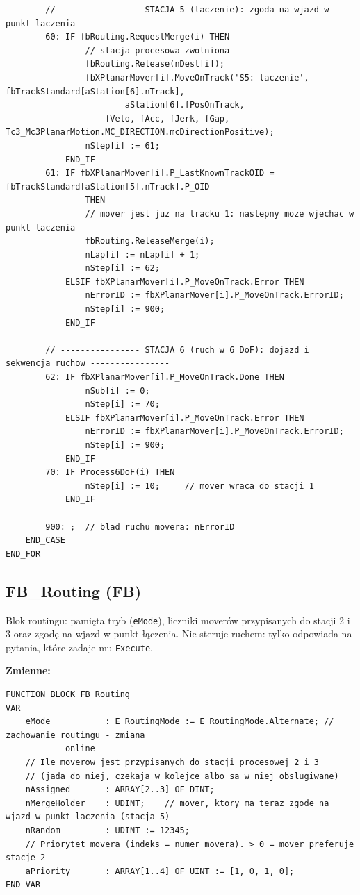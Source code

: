 \documentclass[11pt,a4paper]{report}
\newcommand{\podrozdzial}[1]{\subsection*{#1}\addcontentsline{toc}{subsection}{#1}}
\begin{document}
{\begin{verbatim}
        // ---------------- STACJA 5 (laczenie): zgoda na wjazd w punkt laczenia ----------------
        60: IF fbRouting.RequestMerge(i) THEN
                // stacja procesowa zwolniona
                fbRouting.Release(nDest[i]);
                fbXPlanarMover[i].MoveOnTrack('S5: laczenie', fbTrackStandard[aStation[6].nTrack],
                        aStation[6].fPosOnTrack,
                    fVelo, fAcc, fJerk, fGap, Tc3_Mc3PlanarMotion.MC_DIRECTION.mcDirectionPositive);
                nStep[i] := 61;
            END_IF
        61: IF fbXPlanarMover[i].P_LastKnownTrackOID = fbTrackStandard[aStation[5].nTrack].P_OID
                THEN
                // mover jest juz na tracku 1: nastepny moze wjechac w punkt laczenia
                fbRouting.ReleaseMerge(i);
                nLap[i] := nLap[i] + 1;
                nStep[i] := 62;
            ELSIF fbXPlanarMover[i].P_MoveOnTrack.Error THEN
                nErrorID := fbXPlanarMover[i].P_MoveOnTrack.ErrorID;
                nStep[i] := 900;
            END_IF

        // ---------------- STACJA 6 (ruch w 6 DoF): dojazd i sekwencja ruchow ----------------
        62: IF fbXPlanarMover[i].P_MoveOnTrack.Done THEN
                nSub[i] := 0;
                nStep[i] := 70;
            ELSIF fbXPlanarMover[i].P_MoveOnTrack.Error THEN
                nErrorID := fbXPlanarMover[i].P_MoveOnTrack.ErrorID;
                nStep[i] := 900;
            END_IF
        70: IF Process6DoF(i) THEN
                nStep[i] := 10;     // mover wraca do stacji 1
            END_IF

        900: ;  // blad ruchu movera: nErrorID
    END_CASE
END_FOR
\end{verbatim}}

\podrozdzial{FB\_Routing (FB)}
Blok routingu: pamięta tryb (\texttt{eMode}), liczniki moverów przypisanych do stacji 2 i 3 oraz zgodę na wjazd w punkt łączenia. Nie steruje ruchem: tylko odpowiada na pytania, które zadaje mu \texttt{Execute}.

\textbf{Zmienne:}
{\scriptsize
\begin{verbatim}
FUNCTION_BLOCK FB_Routing
VAR
    eMode           : E_RoutingMode := E_RoutingMode.Alternate; // zachowanie routingu - zmiana
            online
    // Ile moverow jest przypisanych do stacji procesowej 2 i 3
    // (jada do niej, czekaja w kolejce albo sa w niej obslugiwane)
    nAssigned       : ARRAY[2..3] OF DINT;
    nMergeHolder    : UDINT;    // mover, ktory ma teraz zgode na wjazd w punkt laczenia (stacja 5)
    nRandom         : UDINT := 12345;
    // Priorytet movera (indeks = numer movera). > 0 = mover preferuje stacje 2
    aPriority       : ARRAY[1..4] OF UINT := [1, 0, 1, 0];
END_VAR
\end{verbatim}}
\end{document}
